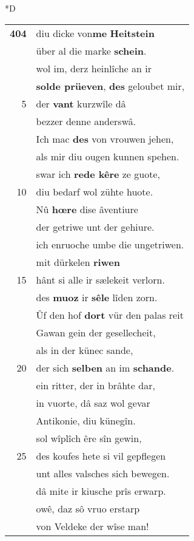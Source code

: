\documentclass[8pt,a4paper,notitlepage]{article}
\begin{document}
\begin{table}[ht]
\begin{minipage}[t]{0.5\linewidth}
\small
\begin{center}*D
\end{center}
\begin{tabular}{rl}
\textbf{404} & diu dicke von\textbf{me} \textbf{Heitstein}\\ 
 & über al die marke \textbf{schein}.\\ 
 & wol im, derz heinlîche an ir\\ 
 & \textbf{solde prüeven}, \textbf{des} geloubet mir,\\ 
5 & der \textbf{vant} kurzwîle dâ\\ 
 & bezzer denne anderswâ.\\ 
 & Ich mac \textbf{des} von vrouwen jehen,\\ 
 & als mir diu ougen kunnen spehen.\\ 
 & swar ich \textbf{rede kêre} ze guote,\\ 
10 & diu bedarf wol zühte huote.\\ 
 & Nû \textbf{hœre} dise âventiure\\ 
 & der getriwe unt der gehiure.\\ 
 & ich enruoche umbe die ungetriwen.\\ 
 & mit dürkelen \textbf{riwen}\\ 
15 & hânt si alle ir sælekeit verlorn.\\ 
 & des \textbf{muoz} ir \textbf{sêle} lîden zorn.\\ 
 & Ûf den hof \textbf{dort} vür den palas reit\\ 
 & Gawan gein der gesellecheit,\\ 
 & als in der künec sande,\\ 
20 & der sich \textbf{selben} an im \textbf{schande}.\\ 
 & ein ritter, der in brâhte dar,\\ 
 & in vuorte, dâ saz wol gevar\\ 
 & Antikonie, diu künegîn.\\ 
 & sol wîplîch êre sîn gewin,\\ 
25 & des koufes hete si vil gepflegen\\ 
 & unt alles valsches sich bewegen.\\ 
 & dâ mite ir kiusche prîs erwarp.\\ 
 & owê, daz sô vruo erstarp\\ 
 & von Veldeke der wîse man!\\ 

\end{tabular}
\end{minipage}
\end{table}
\end{document}
